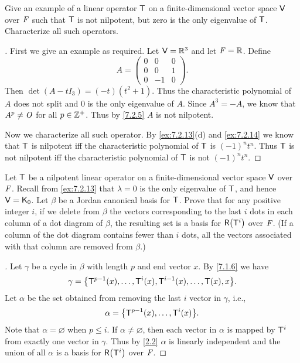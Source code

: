 \begin{ex}\label{ex:7.2.15}
  Give an example of a linear operator \(\mathsf{T}\) on a finite-dimensional vector space \(\mathsf{V}\) over \(\mathit{F}\) such that \(\mathsf{T}\) is not nilpotent, but zero is the only eigenvalue of \(\mathsf{T}\).
  Characterize all such operators.
\end{ex}

\begin{proof}[]
  First we give an example as required.
  Let \(\mathsf{V} = \mathbb{R}^3\) and let \(\mathit{F} = \mathbb{R}\).
  Define
  \[
    A = \begin{pmatrix}
      0 & 0  & 0 \\
      0 & 0  & 1 \\
      0 & -1 & 0
    \end{pmatrix}.
  \]
  Then \(\det(A - t I_3) = (-t)(t^2 + 1)\).
  Thus the characteristic polynomial of \(A\) does not split and \(0\) is the only eigenvalue of \(A\).
  Since \(A^3 = -A\), we know that \(A^p \neq \mathit{O}\) for all \(p \in \mathbb{Z}^+\).
  Thus by \cref{7.2.5} \(A\) is not nilpotent.

  Now we characterize all such operator.
  By \cref{ex:7.2.13}(d) and \cref{ex:7.2.14} we know that \(\mathsf{T}\) is nilpotent iff the characteristic polynomial of \(\mathsf{T}\) is \((-1)^n t^n\).
  Thus \(\mathsf{T}\) is not nilpotent iff the characteristic polynomial of \(\mathsf{T}\) is not \((-1)^n t^n\).
\end{proof}

\begin{ex}\label{ex:7.2.16}
  Let \(\mathsf{T}\) be a nilpotent linear operator on a finite-dimensional vector space \(\mathsf{V}\) over \(\mathit{F}\).
  Recall from \cref{ex:7.2.13} that \(\lambda = 0\) is the only eigenvalue of \(\mathsf{T}\), and hence \(\mathsf{V} = \mathsf{K}_0\).
  Let \(\beta\) be a Jordan canonical basis for \(\mathsf{T}\).
  Prove that for any positive integer \(i\), if we delete from \(\beta\) the vectors corresponding to the last \(i\) dots in each column of a dot diagram of \(\beta\), the resulting set is a basis for \(\rg{\T^i}\) over \(\mathit{F}\).
  (If a column of the dot diagram contains fewer than \(i\) dots, all the vectors associated with that column are removed from \(\beta\).)
\end{ex}

\begin{proof}[]
  Let \(\gamma\) be a cycle in \(\beta\) with length \(p\) and end vector \(x\).
  By \cref{7.1.6} we have
  \[
    \gamma = \set{\T^{p - 1}(x), \dots, \T^i(x), \T^{i - 1}(x), \dots, \T(x), x}.
  \]
  Let \(\alpha\) be the set obtained from removing the last \(i\) vector in \(\gamma\), i.e.,
  \[
    \alpha = \set{\T^{p - 1}(x), \dots, \T^i(x)}.
  \]
  Note that \(\alpha = \varnothing\) when \(p \leq i\).
  If \(\alpha \neq \varnothing\), then each vector in \(\alpha\) is mapped by \(\mathsf{T}^i\) from exactly one vector in \(\gamma\).
  Thus by \cref{2.2} \(\alpha\) is linearly independent and the union of all \(\alpha\) is a basis for \(\rg{\T^i}\) over \(\mathit{F}\).
\end{proof}


